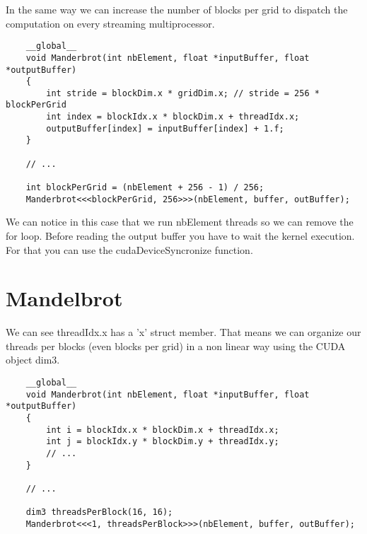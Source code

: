 \documentclass{article}
\begin{document}
In the same way we can increase the number of blocks per grid to dispatch the computation on every streaming multiprocessor.
\begin{lstlisting}
	__global__
	void Manderbrot(int nbElement, float *inputBuffer, float *outputBuffer)
	{
		int stride = blockDim.x * gridDim.x; // stride = 256 * blockPerGrid
		int index = blockIdx.x * blockDim.x + threadIdx.x;
		outputBuffer[index] = inputBuffer[index] + 1.f;
	}
	
	// ...

	int blockPerGrid = (nbElement + 256 - 1) / 256;
	Manderbrot<<<blockPerGrid, 256>>>(nbElement, buffer, outBuffer);
\end{lstlisting}
We can notice in this case that we run nbElement threads so we can remove the for loop. Before reading the output buffer you have to wait the kernel execution. For that you can use the cudaDeviceSyncronize function.

\newpage
\section{Mandelbrot}
We can see threadIdx.x has a 'x' struct member. That means we can organize our threads per blocks (even blocks per grid) in a non linear way using the CUDA object dim3.
\begin{lstlisting}
	__global__
	void Manderbrot(int nbElement, float *inputBuffer, float *outputBuffer)
	{
		int i = blockIdx.x * blockDim.x + threadIdx.x;
		int j = blockIdx.y * blockDim.y + threadIdx.y;
		// ...
	}

	// ...

	dim3 threadsPerBlock(16, 16);
	Manderbrot<<<1, threadsPerBlock>>>(nbElement, buffer, outBuffer);
\end{lstlisting}
\end{document}
